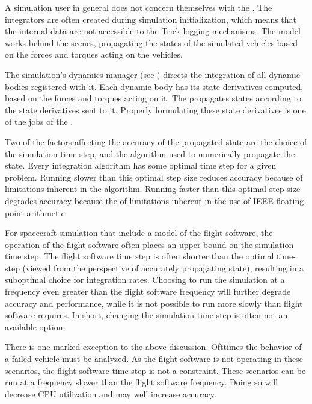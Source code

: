 A simulation user in general does not concern themselves with the \ModelDesc.
The integrators are often created during simulation initialization, which
means that the internal data are not accessible to the Trick logging
mechanisms.
The model works behind the scenes, propagating the states of the simulated
vehicles based on the forces and torques acting on the vehicles.

The simulation's dynamics
manager (see ) directs the
integration of all dynamic bodies registered with it.
Each dynamic body has its state derivatives computed, based on the forces and
torques acting on it.
The \ModelDesc propagates states according to the state derivatives sent
to it. Properly formulating these state derivatives is one of the jobs of the
.

Two of the factors affecting the accuracy of the propagated state are the
choice of the simulation time step, and the algorithm used to numerically
propagate the state. Every integration algorithm has some optimal
time step for a given problem. Running slower than this optimal step
size reduces accuracy because of limitations inherent in the algorithm.
Running faster than this optimal step size degrades accuracy because the
of limitations inherent in the use of IEEE floating point arithmetic.

For spacecraft simulation that include a model of the flight software, the
operation of the flight software often places an upper bound on the simulation
time step.  The flight software time step is often shorter than the optimal
time-step (viewed from the perspective of accurately propagating state),
resulting in a suboptimal choice for integration rates.  Choosing to run
the simulation at a frequency even greater
than the flight software frequency will further degrade accuracy and
performance, while it is not possible to run more slowly than flight software
requires.  In short, changing the simulation time step is often not an
available option.

There is one marked exception to the above discussion. Ofttimes the behavior
of a failed vehicle must be analyzed. As the flight software is not operating
in these scenarios, the flight software time step is not a constraint.
These scenarios can be run at a frequency slower than the flight software
frequency. Doing so will decrease CPU utilization and may well increase
accuracy.

